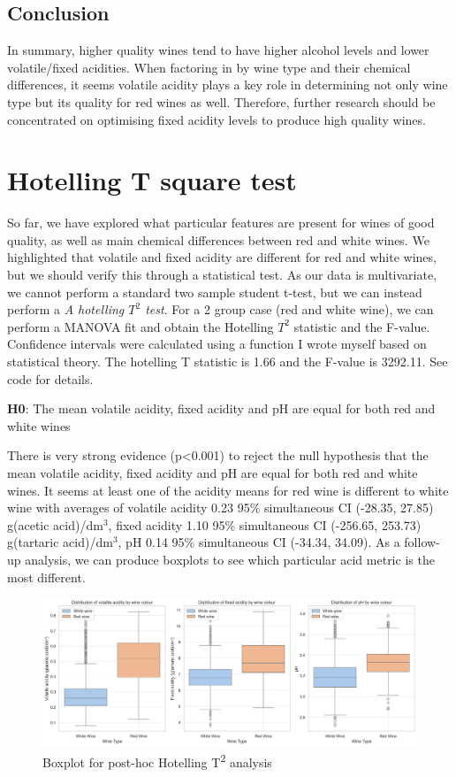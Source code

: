 \documentclass[
]{article}
\begin{document}
\subsection{Conclusion}\label{conclusion}

In summary, higher quality wines tend to have higher alcohol levels and
lower volatile/fixed acidities. When factoring in by wine type and their
chemical differences, it seems volatile acidity plays a key role in
determining not only wine type but its quality for red wines as well.
Therefore, further research should be concentrated on optimising fixed
acidity levels to produce high quality wines.

\section{Hotelling T square test}\label{hotelling-t-square-test}

So far, we have explored what particular features are present for wines
of good quality, as well as main chemical differences between red and
white wines. We highlighted that volatile and fixed acidity are
different for red and white wines, but we should verify this through a
statistical test. As our data is multivariate, we cannot perform a
standard two sample student t-test, but we can instead perform a \emph{A
hotelling \(T^2\) test}. For a 2 group case (red and white wine), we can
perform a MANOVA fit and obtain the Hotelling \(T^2\) statistic and the
F-value. Confidence intervals were calculated using a function I wrote
myself based on statistical theory. The hotelling T statistic is 1.66
and the F-value is 3292.11. See code for details.

\textbf{H0}: The mean volatile acidity, fixed acidity and pH are equal
for both red and white wines

There is very strong evidence (p\textless0.001) to reject the null
hypothesis that the mean volatile acidity, fixed acidity and pH are
equal for both red and white wines. It seems at least one of the acidity
means for red wine is different to white wine with averages of volatile
acidity 0.23 95\% simultaneous CI (-28.35, 27.85) g(acetic
acid)/dm\(^3\), fixed acidity 1.10 95\% simultaneous CI (-256.65,
253.73) g(tartaric acid)/dm\(^3\), pH 0.14 95\% simultaneous CI (-34.34,
34.09). As a follow-up analysis, we can produce boxplots to see which
particular acid metric is the most different.

\begin{figure}
\centering
\includegraphics{box_plots_for_hotelling_two_sample.png}
\caption{Boxplot for post-hoc Hotelling T\textsuperscript{2} analysis}
\end{figure}
\end{document}
